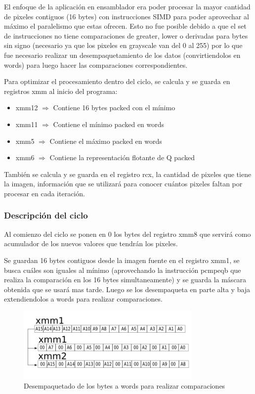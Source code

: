 El enfoque de la aplicación en ensamblador era poder procesar la mayor cantidad de pixeles contiguos (16 bytes) con instrucciones SIMD para poder aprovechar al máximo el paralelismo que estas ofrecen. Esto no fue posible debido a que el set de instrucciones no tiene comparaciones de greater, lower o derivadas para bytes sin signo (necesario ya que los pixeles en grayscale van del 0 al 255) por lo que fue necesario realizar un desempaquetamiento de los datos (convirtiendolos en words) para luego hacer las comparaciones correspondientes.

Para optimizar el procesamiento dentro del ciclo, se calcula y se guarda en registros xmm al inicio del programa:
\begin{itemize}
  \item xmm12 $\Rightarrow$ Contiene 16 bytes packed con el mínimo
  \item xmm11 $\Rightarrow$ Contiene el mínimo packed en words
  \item xmm5 $\Rightarrow$ Contiene el máximo packed en words
  \item xmm6 $\Rightarrow$ Contiene la representación flotante de Q packed
\end{itemize}

También se calcula y se guarda en el registro rcx, la cantidad de pixeles que tiene la imagen, información que se utilizará para conocer cuántos pixeles faltan por procesar en cada iteración.

\subsubsection{Descripción del ciclo}
Al comienzo del ciclo se ponen en 0 los bytes del registro xmm8 que servirá como acumulador de los nuevos valores que tendrán los pixeles.

Se guardan 16 bytes contiguos desde la imagen fuente en el registro xmm1, se busca cuáles son iguales al mínimo (aprovechando la instrucción pcmpeqb que realiza la comparación en los 16 bytes simultaneamente) y se guarda la máscara obtenida que se usará mas tarde. Luego se los desempaqueta en parte alta y baja extendiendolos a words para realizar comparaciones.

\begin{figure}[H]
\centering
\includegraphics[width=90mm]{unpackxmm1.png}
\caption{Desempaquetado de los bytes a words para realizar comparaciones}
\label{overflow}
\end{figure}

